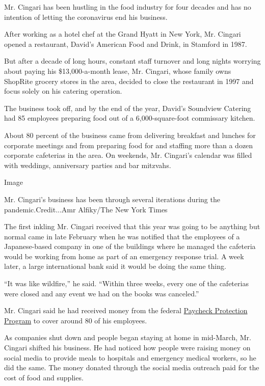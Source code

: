 Mr. Cingari has been hustling in the food industry for four decades and
has no intention of letting the coronavirus end his business.

After working as a hotel chef at the Grand Hyatt in New York, Mr.
Cingari opened a restaurant, David's American Food and Drink, in
Stamford in 1987.

But after a decade of long hours, constant staff turnover and long
nights worrying about paying his \$13,000-a-month lease, Mr. Cingari,
whose family owns ShopRite grocery stores in the area, decided to close
the restaurant in 1997 and focus solely on his catering operation.

The business took off, and by the end of the year, David's Soundview
Catering had 85 employees preparing food out of a 6,000-square-foot
commissary kitchen.

About 80 percent of the business came from delivering breakfast and
lunches for corporate meetings and from preparing food for and staffing
more than a dozen corporate cafeterias in the area. On weekends, Mr.
Cingari's calendar was filled with weddings, anniversary parties and bar
mitzvahs.

Image

Mr. Cingari's business has been through several iterations during the
pandemic.Credit...Amr Alfiky/The New York Times

The first inkling Mr. Cingari received that this year was going to be
anything but normal came in late February when he was notified that the
employees of a Japanese-based company in one of the buildings where he
managed the cafeteria would be working from home as part of an emergency
response trial. A week later, a large international bank said it would
be doing the same thing.

``It was like wildfire,'' he said. ``Within three weeks, every one of
the cafeterias were closed and any event we had on the books was
canceled.''

Mr. Cingari said he had received money from the federal
\href{https://www.nytimes3xbfgragh.onion/article/small-business-loans-stimulus-grants-freelancers-coronavirus.html}{Paycheck
Protection Program} to cover around 80 of his employees.

As companies shut down and people began staying at home in mid-March,
Mr. Cingari shifted his business. He had noticed how people were raising
money on social media to provide meals to hospitals and emergency
medical workers, so he did the same. The money donated through the
social media outreach paid for the cost of food and supplies.

